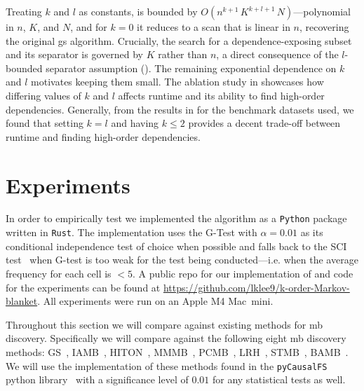 \documentclass[accepted]{uai2026} %
\theoremstyle{plain}
\theoremstyle{definition}
\theoremstyle{remark}
\begin{document}
Treating $k$ and $l$ as constants,  is bounded by
$O(n^{k+1}\,K^{k+l+1}\,N)$---polynomial in $n$, $K$, and $N$, and for
$k=0$ it reduces to a scan that is linear in $n$, recovering the
original \gls{gs} algorithm. Crucially, the search for a
dependence-exposing subset and its separator is governed by $K$ rather
than $n$, a direct consequence of the $l$-bounded separator assumption
(). The remaining exponential dependence on $k$ and
$l$ motivates keeping them small. The ablation study in
 showcases how differing values of $k$ and $l$
affects  runtime and its ability to find high-order
dependencies. Generally, from the results in  for
the benchmark datasets used, we found that setting $k=l$ and having
$k\leq 2$ provides a decent trade-off between runtime and finding
high-order dependencies.

\begin{table}
  \centering
  \caption{Results on Synthetically Generated Data}
  \label{tab:syn}
  
\end{table}


\section{Experiments}\label{sec:exp}
In order to empirically test {\method} we implemented the algorithm as a
\texttt{Python} package written in \texttt{Rust}. The implementation
uses the G-Test with $\alpha=0.01$ as its conditional independence test
of choice when possible and falls back to the SCI test~\citep{marx2019}
when G-test is too weak for the test being conducted---i.e. when the
average frequency for each cell is $<5$. A public repo for our
implementation of {\method} and code for the experiments can be found at
\url{https://github.com/lklee9/k-order-Markov-blanket}. All experiments
were run on an Apple M4 Mac~mini.


Throughout this section we will compare {\method} against existing
methods for \acrfull{mb} discovery. Specifically we will compare
against the following eight \gls{mb} discovery methods:
GS~\citep{margaritis1999}, IAMB~\citep{tsamardinos2003},
HITON~\citep{aliferis2003}, MMMB~\citep{tsamardinos2003b},
PCMB~\citep{pena2007}, LRH~\citep{liu2016}, STMB~\citep{gao2017a},
BAMB~\citep{ling2019}. We will use the implementation of these methods
found in the \texttt{pyCausalFS} python library~\citep{yu2020a} with a
significance level of $0.01$ for any statistical tests as well.
\end{document}
